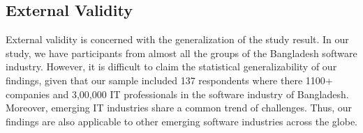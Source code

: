 \subsection{External Validity}
External validity is concerned with the generalization of the study result. In our study, we have participants from almost all the groups of the Bangladesh software industry. However, it is difficult to claim the statistical generalizability of our findings, given that our sample included 137 respondents where there 1100+ companies and 3,00,000 IT professionals\cite{BASIS2018} in the software industry of Bangladesh. Moreover, emerging IT industries share a common trend of challenges\cite{Sison2006, lloyd2020}. Thus, our findings are also applicable to other emerging software industries across the globe.